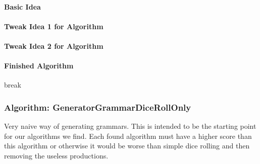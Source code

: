 \paragraph{Basic Idea}

\paragraph{Tweak Idea 1 for Algorithm}

\paragraph{Tweak Idea 2 for Algorithm}

\paragraph{Finished Algorithm}
break
\pagebreak
\subsubsection{Algorithm: GeneratorGrammarDiceRollOnly}
\noindent Very naive way of generating grammars. This is intended to be the starting point for our algorithms we find. Each found algorithm must have a higher score than this algorithm or otherwise it would be worse than simple dice rolling and then removing the useless productions.\\

\noindent
{}\\

